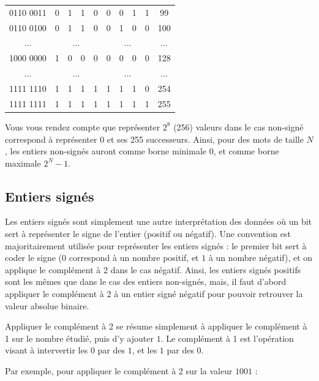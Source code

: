 \documentclass[11pt,a4paper]{article}
\begin{document}
\begin{center}
\begin{tabular}{ | c | c c c c | c c c c | c |}
0110 0011  &  0 & 1 & 1 & 0  &  0 & 0 & 1 & 1   & 99 \\
0110 0100  &  0 & 1 & 1 & 0  &  0 & 1 & 0 & 0   & 100 \\
... & \multicolumn{4}{c|}{...} & \multicolumn{4}{c|}{...} & ... \\
1000 0000  &  1 & 0 & 0 & 0  &  0 & 0 & 0 & 0   & 128 \\
... & \multicolumn{4}{c|}{...} & \multicolumn{4}{c|}{...} & ... \\
1111 1110  &  1 & 1 & 1 & 1  &  1 & 1 & 1 & 0   & 254 \\
1111 1111  &  1 & 1 & 1 & 1  &  1 & 1 & 1 & 1   & 255 \\
\hline
\end{tabular}
\end{center}

\bigskip

Vous vous rendez compte que représenter $ 2^8 $ (256) valeurs  dans le cas non-signé correspond à représenter $ 0 $ et ses 255 successeurs.
Ainsi, pour des mots de taille $ N $, les entiers non-signés auront comme borne minimale $ 0 $, et comme borne maximale $ 2^N - 1 $.

\bigskip


\subsection{Entiers signés}

\medskip

Les entiers signés sont simplement une autre interprétation des données où un bit sert à représenter le signe de l'entier (positif ou négatif).
Une convention est majoritairement utilisée pour représenter les entiers signés : le premier bit sert à coder le signe ($ 0 $ correspond à un nombre positif, et $ 1 $ à un nombre négatif), et on applique le complément à 2 dans le cas négatif.
Ainsi, les entiers signés positifs sont les mêmes que dans le cas des entiers non-signés, mais, il faut d'abord appliquer le complément à 2 à un entier signé négatif pour pouvoir retrouver la valeur absolue binaire.

\bigskip

Appliquer le complément à 2 se résume simplement à appliquer le complément à 1 sur le nombre étudié, puis d'y ajouter $ 1 $.
Le complément à 1 est l'opération visant à intervertir les $ 0 $ par des $ 1 $, et les $ 1 $ par des $ 0 $.

Par exemple, pour appliquer le complément à 2 sur la valeur $ 1001 $ :
\end{document}
